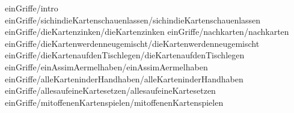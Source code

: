 
 {einGriffe/intro}
 {einGriffe/sichindieKartenschauenlassen/sichindieKartenschauenlassen}
 {einGriffe/dieKartenzinken/dieKartenzinken}
 {einGriffe/nachkarten/nachkarten}
 {einGriffe/dieKartenwerdenneugemischt/dieKartenwerdenneugemischt}
 {einGriffe/dieKartenaufdenTischlegen/dieKartenaufdenTischlegen}
 {einGriffe/einAssimAermelhaben/einAssimAermelhaben}
 {einGriffe/alleKarteninderHandhaben/alleKarteninderHandhaben}
 {einGriffe/allesaufeineKartesetzen/allesaufeineKartesetzen}
 {einGriffe/mitoffenenKartenspielen/mitoffenenKartenspielen}
